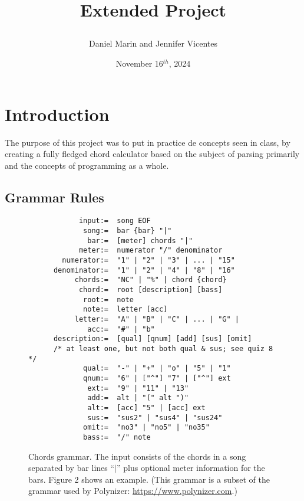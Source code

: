 \documentclass{article}
\begin{document}
\title{Extended Project
\author{Daniel Marin and Jennifer Vicentes}
\date{November 16$^{th}$, 2024}}
\maketitle
\tableofcontents
\newpage

\section{Introduction}
The purpose of this project was to put in practice de concepts seen in class, by creating a fully fledged chord calculator based on the subject of parsing primarily and the concepts of programming as a whole.
\subsection{Grammar Rules}
\begin{figure}[H]
    \begin{centering}
    \begin{lstlisting}
            input:=  song EOF
             song:=  bar {bar} "|"
              bar:=  [meter] chords "|"
            meter:=  numerator "/" denominator
        numerator:=  "1" | "2" | "3" | ... | "15"
      denominator:=  "1" | "2" | "4" | "8" | "16"
           chords:=  "NC" | "%" | chord {chord}
            chord:=  root [description] [bass]
             root:=  note
             note:=  letter [acc]
           letter:=  "A" | "B" | "C" | ... | "G" |
              acc:=  "#" | "b"
      description:=  [qual] [qnum] [add] [sus] [omit]
      /* at least one, but not both qual & sus; see quiz 8 */
             qual:=  "-" | "+" | "o" | "5" | "1"
             qnum:=  "6" | ["^"] "7" | ["^"] ext
              ext:=  "9" | "11" | "13"
              add:=  alt | "(" alt ")"
              alt:=  [acc] "5" | [acc] ext
              sus:=  "sus2" | "sus4" | "sus24"
             omit:=  "no3" | "no5" | "no35"
             bass:=  "/" note
    \end{lstlisting}
    \caption{Chords grammar. The input consists of the chords in a song separated by bar lines ``$\vert$'' plus optional meter information for the bars. Figure 2 shows an example. (This grammar is a subset of the grammar used by Polynizer: \url{https://www.polynizer.com}.)}
    \label{fig:grammar}
    \end{centering}
\end{figure}
\end{document}
